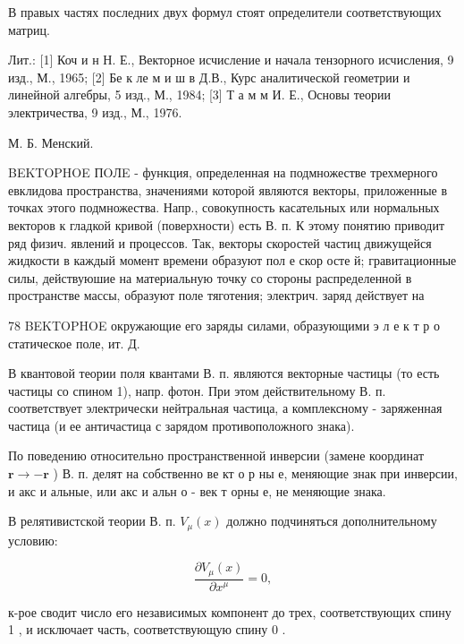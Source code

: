 \documentclass[10pt]{article}
\begin{document}
В правых частях последних двух формул стоят определители соответствующих матриц.



Лит.: [1] Коч и н Н. Е., Векторное исчисление и начала тензорного исчисления, 9 изд., М., 1965; [2] Бе к ле м и ш в Д.В., Курс аналитической геометрии и линейной алгебры, 5 изд., М., 1984; [3] Т а м м И. Е., Основы теории электричества, 9 изд., М., 1976.



М. Б. Менский.



BEKTOPHOE ПOЛE - функция, определенная на подмножестве трехмерного евклидова пространства, значениями которой являются векторы, приложенные в точках этого подмножества. Напр., совокупность касательных или нормальных векторов к гладкой кривой (поверхности) есть В. п. К этому понятию приводит ряд физич. явлений и процессов. Так, векторы скоростей частиц движущейся жидкости в каждый момент времени образуют пол е скор осте й; гравитационные силы, действуюшие на материальную точку со стороны распределенной в пространстве массы, образуют поле тяготения; электрич. заряд действует на



78 BEKTOPHOE окружающие его заряды силами, образующими э л е к т р о статическое поле, ит. Д.



В квантовой теории поля квантами В. п. являются векторные частицы (то есть частицы со спином 1), напр. фотон. При этом действительному В. п. соответствует электрически нейтральная частица, а комплексному - заряженная частица (и ее античастица с зарядом противоположного знака).



По поведению относительно пространственной инверсии (замене координат $\boldsymbol{r} \rightarrow-\boldsymbol{r}$ ) В. п. делят на собственно ве кт о р ны е, меняющие знак при инверсии, и акс и альные, или акс и альн о - век т орны е, не меняющие знака.



В релятивистской теории В. п. $V_{\mu}(x)$ должно подчиняться дополнительному условию:



\[

\frac{\partial V_{\mu}(x)}{\partial x^{\mu}}=0,

\]



к-рое сводит число его независимых компонент до трех, соответствующих спину 1 , и исключает часть, соответствующую спину 0 .
\end{document}
